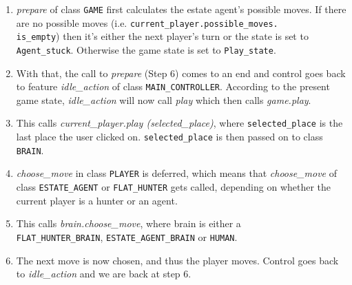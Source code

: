 \begin{enumerate}
  \item \textit{prepare} of class \texttt{GAME} first calculates the estate agent's possible moves. If there are no possible moves (i.e. \texttt{current\_player.possible\_moves.\\is\_empty}) then it's either the next player's turn or the state is set to \texttt{Agent\_stuck}. Otherwise the game state is set to \texttt{Play\_state}.
  \item With that, the call to \textit{prepare} (Step 6) comes to an end and control goes back to feature \textit{idle\_action} of class \texttt{MAIN\_CONTROLLER}. According to the present game state, \textit{idle\_action} will now call \textit{play} which then calls \textit{game.play}.
  \item This calls \textit{current\_player.play (selected\_place)}, where \texttt{selected\_place} is the last place the user clicked on. \texttt{selected\_place} is then passed on to class \texttt{BRAIN}.
  \item \textit{choose\_move} in class \texttt{PLAYER} is deferred, which means that \textit{choose\_move} of class \texttt{ESTATE\_AGENT} or \texttt{FLAT\_HUNTER} gets called, depending on whether the current player is a hunter or an agent.
  \item This calls \textit{brain.choose\_move}, where brain is either a\\ \texttt{FLAT\_HUNTER\_BRAIN}, \texttt{ESTATE\_AGENT\_BRAIN} or \texttt{HUMAN}.
  \item The next move is now chosen, and thus the player moves. Control goes back to \textit{idle\_action} and we are back at step 6.
\end{enumerate}
